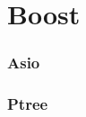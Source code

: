 \section{Boost}\label{sec:Boost}

\subsubsection{Asio}\label{subsubsec:Asio}

\subsubsection{Ptree}\label{subsubsec:Ptree}



